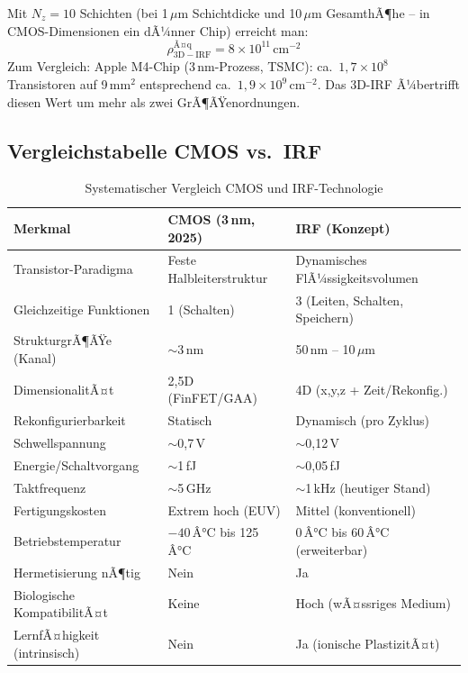 ﻿\documentclass[a4paper,12pt]{scrreprt}
\theoremstyle{definition}
\begin{document}
Mit $N_z = 10$ Schichten (bei 1\,$\mu$m Schichtdicke und 10\,$\mu$m GesamthÃ¶he --
in CMOS-Dimensionen ein dÃ¼nner Chip) erreicht man:
\begin{equation}
	\rho_{\mathrm{3D-IRF}}^{\mathrm{Ã¤q}} = 8 \times 10^{11}\,\text{cm}^{-2}
	\label{eq:dichte_beispiel}
\end{equation}
Zum Vergleich: Apple M4-Chip (3\,nm-Prozess, TSMC): ca.\ $1{,}7 \times 10^{8}$ Transistoren
auf 9\,mm$^2$ entsprechend ca.\ $1{,}9 \times 10^{9}$\,cm$^{-2}$. Das 3D-IRF Ã¼bertrifft
diesen Wert um mehr als zwei GrÃ¶ÃŸenordnungen.

\subsection{Vergleichstabelle CMOS vs.\ IRF}

\begin{table}[H]
	\centering
	\caption{Systematischer Vergleich CMOS und IRF-Technologie}
	\label{tab:vergleich_cmos_irf}
	\begin{tabular}{p{4.2cm}p{4.5cm}p{4.5cm}}
		\toprule
		\textbf{Merkmal} & \textbf{CMOS (3\,nm, 2025)} & \textbf{IRF (Konzept)} \\
		\midrule
		Transistor-Paradigma & Feste Halbleiterstruktur & Dynamisches FlÃ¼ssigkeitsvolumen \\
		Gleichzeitige Funktionen & 1 (Schalten) & 3 (Leiten, Schalten, Speichern) \\
		StrukturgrÃ¶ÃŸe (Kanal) & $\sim$3\,nm & 50\,nm -- 10\,$\mu$m \\
		DimensionalitÃ¤t & 2{,}5D (FinFET/GAA) & 4D (x,y,z + Zeit/Rekonfig.) \\
		Rekonfigurierbarkeit & Statisch & Dynamisch (pro Zyklus) \\
		Schwellspannung & $\sim$0{,}7\,V & $\sim$0{,}12\,V \\
		Energie/Schaltvorgang & $\sim$1\,fJ & $\sim$0{,}05\,fJ \\
		Taktfrequenz & $\sim$5\,GHz & $\sim$1\,kHz (heutiger Stand) \\
		Fertigungskosten & Extrem hoch (EUV) & Mittel (konventionell) \\
		Betriebstemperatur & $-40$\,Â°C bis 125\,Â°C & $0$\,Â°C bis 60\,Â°C (erweiterbar) \\
		Hermetisierung nÃ¶tig & Nein & Ja \\
		Biologische KompatibilitÃ¤t & Keine & Hoch (wÃ¤ssriges Medium) \\
		LernfÃ¤higkeit (intrinsisch) & Nein & Ja (ionische PlastizitÃ¤t) \\
		\bottomrule
	\end{tabular}
\end{table}
\end{document}
